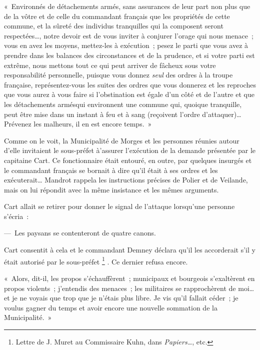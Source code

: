 \documentclass[french,twoside]{book} %
\newenvironment{quoteblock}%
  {\begin{quoting}}
  {\end{quoting}}
\newenvironment{quotebar}{%
    \def\FrameCommand{{\color{rubric!10!}\vrule width 0.5em} \hspace{0.9em}}%
    \def\OuterFrameSep{\itemsep} %
    \MakeFramed {\advance\hsize-\width \FrameRestore}
  }%
  {%
    \endMakeFramed
  }
\renewenvironment{quoteblock}%
  {%
    \savenotes
    \setstretch{0.9}
    \normalfont
    \begin{quotebar}
  }
  {%
    \end{quotebar}
    \spewnotes
  }
\begin{document}
\begin{quoteblock}
 \noindent « Environnés de détachements armés, sans assurances de leur part non plus que de la vôtre et de celle du commandant français que les propriétés de cette commune, et la sûreté des individus tranquilles qui la composent seront respectées…, notre devoir est de vous inviter à conjurer l’orage qui nous menace ; vous en avez les moyens, mettez-les à exécution ; pesez le parti que vous avez à prendre dans les balances des circonstances et de la prudence, et si votre parti est extrême, nous mettons tout ce qui peut arriver de fâcheux sous votre responsabilité personnelle, puisque vous donnez \emph{seul} des ordres à la troupe française, représentez-vous les suites des ordres que vous donnerez et les reproches que vous aurez à vous faire si l’obstination est égale d’un côté et de l’autre et que les détachements armésqui environnent une commune qui, quoique tranquille, peut être mise dans un instant à feu et à sang (reçoivent l’ordre d’attaquer)… Prévenez les malheurs, il en est encore temps. »
 \end{quoteblock}

\noindent Comme on le voit, la Municipalité de Morges et les personnes réunies autour d’elle invitaient le sous-préfet à'assurer l’exécution de la demande présentée par le capitaine Cart. Ce fonctionnaire était entouré, en outre, par quelques insurgés et le commandant français se bornait à dire qu’il était à ses ordres et les exécuterait… Mandrot rappela les instructions précises de Polier et de Veilande, mais on lui répondit avec la même insistance et les mêmes arguments.\par
Cart allait se retirer pour donner le signal de l’attaque lorsqu’une personne s’écria :\par
— Les paysans se contenteront de quatre canons.\par
Cart consentit à cela et le commandant Demney déclara qu’il les accorderait s’il y était autorisé par le sous-préfet \footnote{Lettre de J. Muret au Commissaire Kuhn, dans \emph{Papiers…}, etc.} . Ce dernier refusa encore.\par

\begin{quoteblock}
 \noindent « Alors, dit-il, les propos s’échauffèrent ; municipaux et bourgeois s’exaltèrent en propos violents ; j’entendis des menaces ; les militaires se rapprochèrent de moi… et je ne voyais que trop que je n’étais plus libre. Je vis qu’il fallait céder ; je voulus gagner du temps et avoir encore une nouvelle sommation de la Municipalité. »
 \end{quoteblock}
\end{document}
